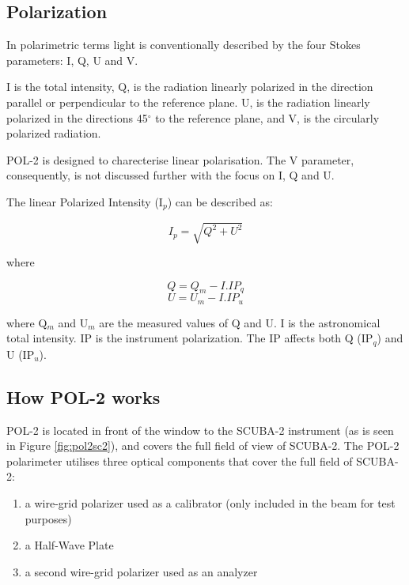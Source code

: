 \subsection*{Polarization}

In polarimetric terms light is conventionally 
described by the four Stokes parameters: I, Q, U and V.


I is the total intensity, Q, is the radiation linearly polarized in the
direction parallel or perpendicular to the reference plane. U, is the
radiation linearly polarized in the directions 45$^{\circ }$ to the
reference plane, and V, is the circularly polarized radiation.

POL-2 is designed to charecterise linear polarisation. 
The V parameter, consequently, is not discussed further
with the focus on I, Q and U.

The linear Polarized Intensity (I$_{p}$) can be described as:

\begin{equation}
I_{p} = \sqrt{Q^{2}+U^{2}}
\end{equation}

where

\begin{equation}
Q = Q_{m} - I . IP_{q}
\end{equation}
\begin{equation}
U = U_{m} - I . IP_{u}
\end{equation}

where Q$_{m}$ and U$_{m}$ are the measured values of Q and U.
I is the astronomical total intensity.
IP is the instrument polarization. The IP affects both Q
(IP$_{q}$) and U (IP$_{u}$).


\subsection*{How POL-2 works}

POL-2 is located in front of the window to the SCUBA-2 instrument
(as is seen in Figure \ref{fig:pol2sc2}), and covers the full
field of view of SCUBA-2. The POL-2 polarimeter
utilises three optical components
that cover the full field of SCUBA-2:

\begin{enumerate}\itemsep-0.2em
\item a wire-grid polarizer used as a calibrator (only included in the
beam for test purposes)
\item a Half-Wave Plate
\item a second wire-grid polarizer used as an analyzer
\end{enumerate}


